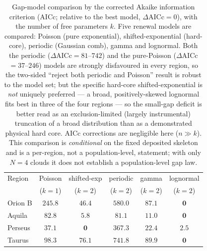 \documentclass[usenatbib,twoside,twocolumn]{mnras}
\begin{document}
\begin{table}
\caption{Gap-model comparison by the corrected Akaike information criterion (AICc; relative to the best model, $\Delta$AICc$=0$), with the number of free parameters $k$. Five renewal models are compared: Poisson (pure exponential), shifted-exponential (hard-core), periodic (Gaussian comb), gamma and lognormal. Both the periodic ($\Delta$AICc$=81$--$742$) and the pure-Poisson ($\Delta$AICc$=37$--$246$) models are strongly disfavoured in every region, so the two-sided ``reject both periodic and Poisson'' result is robust to the model set; but the specific hard-core shifted-exponential is \emph{not} uniquely preferred --- a broad, positively-skewed lognormal fits best in three of the four regions --- so the small-gap deficit is better read as an exclusion-limited (largely instrumental) truncation of a broad distribution than as a demonstrated physical hard core. AICc corrections are negligible here ($n\gg k$). This comparison is \emph{conditional} on the fixed deposited skeleton and is a per-region, not a population-level, statement; with only $N=4$ clouds it does not establish a population-level gap law.}
\label{tab:aic}
\footnotesize
\setlength{\tabcolsep}{3pt}
\begin{tabular}{lccccc}
\toprule
Region & Poisson & shifted-exp & periodic & gamma & lognormal \\
       & ($k{=}1$) & ($k{=}2$) & ($k{=}2$) & ($k{=}2$) & ($k{=}2$) \\
\midrule
Orion B & $245.8$ & $46.4$ & $580.0$ & $87.1$ & $\mathbf{0}$ \\
Aquila  & $82.8$  & $5.8$  & $81.1$  & $11.0$ & $\mathbf{0}$ \\
Perseus & $37.1$  & $\mathbf{0}$ & $367.3$ & $22.4$ & $2.5$ \\
Taurus  & $98.3$  & $76.1$ & $741.8$ & $89.9$ & $\mathbf{0}$ \\
\bottomrule
\end{tabular}
\end{table}
\end{document}
